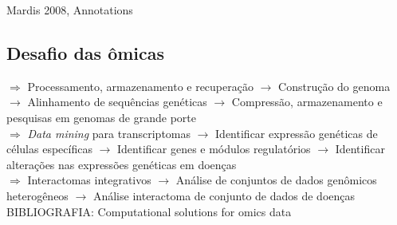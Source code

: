 \indent Mardis 2008, Annotations


\subsection{Desafio das ômicas}

$\Rightarrow$ Processamento, armazenamento e recuperação
$\longrightarrow$ Construção do genoma
$\longrightarrow$ Alinhamento de sequências genéticas
$\longrightarrow$ Compressão, armazenamento e pesquisas em genomas de grande porte
\\
$\Rightarrow$ \textit{Data mining} para transcriptomas
$\longrightarrow$ Identificar expressão genéticas de células específicas
$\longrightarrow$ Identificar genes e módulos regulatórios
$\longrightarrow$ Identificar alterações nas expressões genéticas em doenças
\\
$\Rightarrow$ Interactomas integrativos
$\longrightarrow$ Análise de conjuntos de dados genômicos heterogêneos
$\longrightarrow$ Análise interactoma de conjunto de dados de doenças
\\
BIBLIOGRAFIA: Computational solutions for omics data
